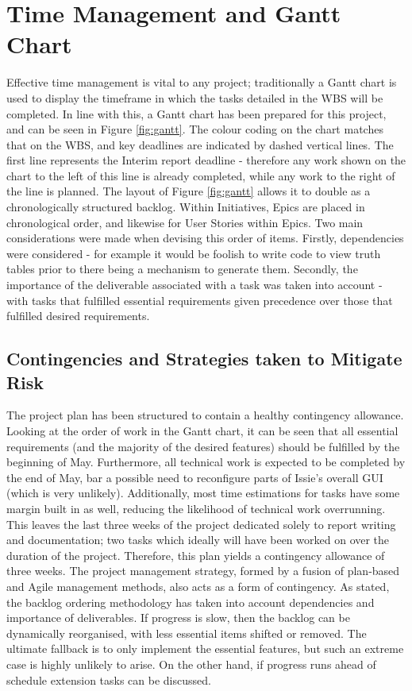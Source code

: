 \section{Time Management and Gantt Chart}
Effective time management is vital to any project; traditionally a Gantt chart is used to display the timeframe in which the tasks detailed in the WBS will be completed. In line with this, a Gantt chart has been prepared for this project, and can be seen in Figure \ref{fig:gantt}. The colour coding on the chart matches that on the WBS, and key deadlines are indicated by dashed vertical lines. The first line represents the Interim report deadline - therefore any work shown on the chart to the left of this line is already completed, while any work to the right of the line is planned. The layout of Figure \ref{fig:gantt} allows it to double as a chronologically structured backlog. Within Initiatives, Epics are placed in chronological order, and likewise for User Stories within Epics. Two main considerations were made when devising this order of items. Firstly, dependencies were considered - for example it would be foolish to write code to view truth tables prior to there being a mechanism to generate them. Secondly, the importance of the deliverable associated with a task was taken into account - with tasks that fulfilled essential requirements given precedence over those that fulfilled desired requirements. 

\subsection{Contingencies and Strategies taken to Mitigate Risk}
The project plan has been structured to contain a healthy contingency allowance. Looking at the order of work in the Gantt chart, it can be seen that all essential requirements (and the majority of the desired features) should be fulfilled by the beginning of May. Furthermore, all technical work is expected to be completed by the end of May, bar a possible need to reconfigure parts of Issie's overall GUI (which is very unlikely).
Additionally, most time estimations for tasks have some margin built in as well, reducing the likelihood of technical work overrunning. This leaves the last three weeks of the project dedicated solely to report writing and documentation; two tasks which ideally will have been worked on over the duration of the project. Therefore, this plan yields a contingency allowance of three weeks.
The project management strategy, formed by a fusion of plan-based and Agile management methods, also acts as a form of contingency. As stated, the backlog ordering methodology has taken into account dependencies and importance of deliverables. If progress is slow, then the backlog can be dynamically reorganised, with less essential items shifted or removed. The ultimate fallback is to only implement the essential features, but such an extreme case is highly unlikely to arise. On the other hand, if progress runs ahead of schedule extension tasks can be discussed.

